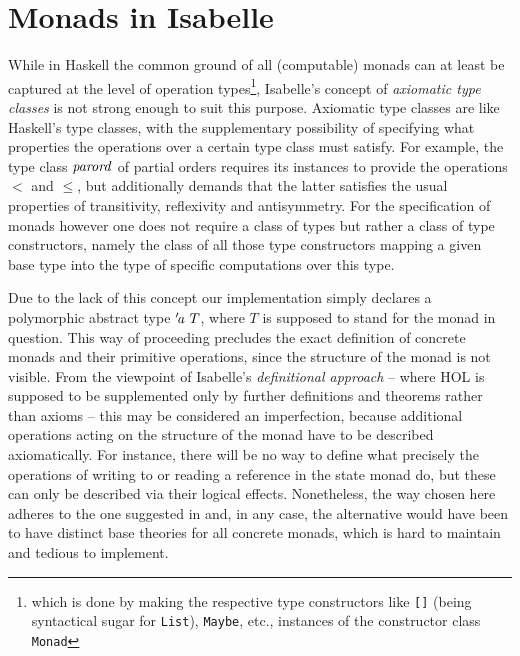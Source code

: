 \section{Monads in Isabelle}
\label{sec:monads-isabelle}
While in Haskell the common ground of all (computable) monads can at least be
captured at the level of operation types\footnote{which is done by making the
  respective type constructors like \texttt{[]} (being syntactical sugar for
  \texttt{List}), \texttt{Maybe}, etc., instances of the constructor class
  \texttt{Monad}}, Isabelle's concept of \emph{axiomatic type classes} is not
strong enough to suit this purpose.  Axiomatic type classes are like Haskell's
type classes, with the supplementary possibility of specifying what properties
the operations over a certain type class must satisfy. For example, the type
class $\mathit{parord}$ of partial orders requires its instances to provide the
operations $<$ and $\leq$, but additionally demands that the latter satisfies the
usual properties of transitivity, reflexivity and antisymmetry. For the
specification of monads however one does not require a class of types but rather
a class of type constructors, namely the class of all those type constructors
mapping a given base type into the type of specific computations over this type.

Due to the lack of this concept our implementation simply declares a
polymorphic abstract type $\ivar{a}\ T$, where $T$ is supposed to stand for
the monad in question. This way of proceeding precludes the exact definition of
concrete monads and their primitive operations, since the structure of the monad
is not visible. From the viewpoint of Isabelle's \emph{definitional approach}
-- where HOL is supposed to be supplemented only by further definitions and
theorems rather than axioms -- this may be considered an imperfection, because
additional operations acting on the structure of the monad have to be described
axiomatically. For instance, there will be no way to define what precisely the
operations of writing to or reading a reference in the state monad do, but these
can only be described via their logical effects.  Nonetheless, the way
chosen here adheres to the one suggested in \cite{SchroederMossakowski:PDL} and,
in any case, the alternative would have been to have distinct base theories for
all concrete monads, which is hard to maintain and tedious to implement.


